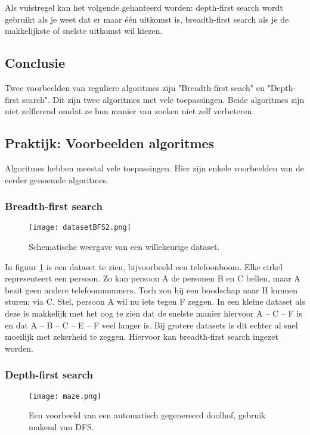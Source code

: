 Als vuistregel kan het volgende gehanteerd worden: depth-first search wordt gebruikt als je weet dat er maar \'e\'en uitkomst is, breadth-first search als je de makkelijkste of snelste uitkomst wil kiezen.

\subsection{Conclusie}
Twee voorbeelden van reguliere algoritmes zijn "Breadth-first seach" en  "Depth-first search". Dit zijn twee algoritmes met vele toepassingen. Beide algoritmes zijn niet zelflerend omdat ze hun manier van zoeken niet zelf verbeteren.
\newpage

\textcolor{praktijk}{
\subsection{Praktijk: Voorbeelden algoritmes}
}

Algoritmes hebben meestal vele toepassingen. Hier zijn enkele voorbeelden van de eerder genoemde algoritmes.
\subsubsection{Breadth-first search}
\begin{figure}[h]
  \centering
    \texttt{[image: datasetBFS2.png]}
  \caption{Schematische weergave van een willekeurige dataset.}
  \label{fig:datasetBFS2}
\end{figure}

In figuur \ref{fig:datasetBFS2} is een dataset te zien, bijvoorbeeld een telefoonboom. Elke cirkel representeert een persoon. Zo kan persoon A de personen B en C bellen, maar A bezit geen andere telefoonnummers. Toch zou hij een boodschap naar H kunnen sturen: via C. 
Stel, persoon A wil nu iets tegen F zeggen. In een kleine dataset als deze is makkelijk met het oog te zien dat de snelste manier hiervoor A – C – F is en dat A – B – C – E – F veel langer is. Bij grotere datasets is dit echter al snel moeilijk met zekerheid te zeggen. Hiervoor kan breadth-first search ingezet worden.

\subsubsection{Depth-first search}

\begin{figure}[H]
  \centering
    \texttt{[image: maze.png]}
  \caption{Een voorbeeld van een automatisch gegenereerd doolhof, gebruik makend van DFS.}
  \label{fig:maze}
\end{figure}

